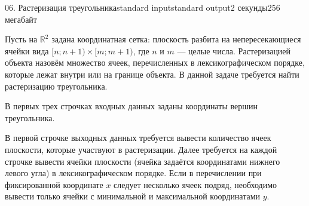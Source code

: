 \begin{problem}{06. Растеризация треугольника}{standard input}{standard output}{2 секунды}{256 мегабайт}

Пусть на $\mathbb R^2$ задана координатная сетка: плоскость разбита на непересекающиеся ячейки вида $[n; n + 1) \times [m; m + 1)$, где $n$ и $m$ --- целые числа. Растеризацией объекта назовём множество ячеек, перечисленных в лексикографическом порядке, которые лежат внутри или на границе объекта. В данной задаче требуется найти растеризацию треугольника.

\InputFile

В первых трех строчках входных данных заданы координаты вершин треугольника.

\OutputFile

В первой строчке выходных данных требуется вывести количество ячеек плоскости, которые участвуют в растеризации. Далее требуется на каждой строчке вывести ячейки плоскости (ячейка задаётся координатами нижнего левого угла) в лексикографическом порядке. Если в перечислении при фиксированной координате $x$ следует несколько ячеек подряд, необходимо вывести только ячейки с минимальной и максимальной координатами $y$.

\Examples

\begin{example}%
%
\end{example}

\end{problem}
